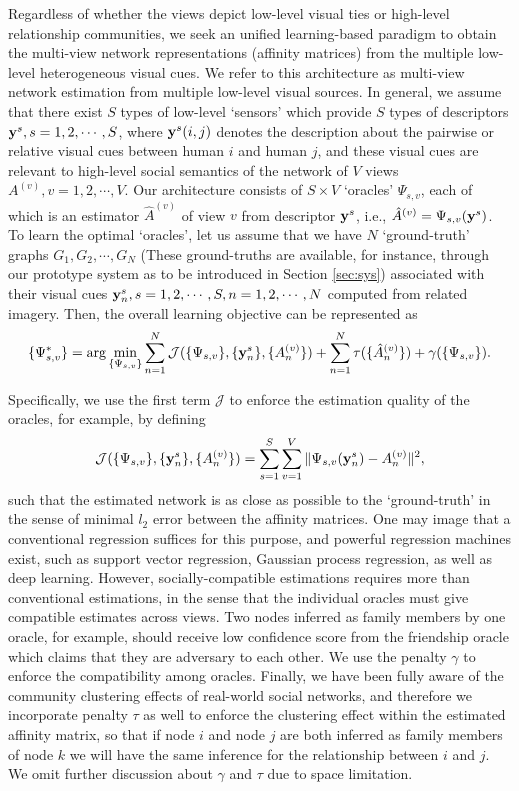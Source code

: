 Regardless of whether the views depict low-level visual ties or high-level relationship communities, we seek an unified learning-based paradigm to obtain the multi-view network representations (affinity matrices) from the multiple low-level heterogeneous visual cues. We refer to this architecture as multi-view network estimation from multiple low-level visual sources. In general, we assume that there exist $S$ types of low-level `sensors' which provide $S$ types of descriptors ${\bf y}^s, s=1,2,\cdots,S$, where ${\bf y}^s(i,j)$ denotes the description about the pairwise or relative visual cues between human $i$ and human $j$, and these visual cues are relevant to high-level social semantics of the network of $V$ views $A^{(v)}, v=1,2,\cdots,V$. Our architecture consists of $S\times V$ `oracles' $\Psi_{s,v}$, each of which is an estimator $\hat{A}^{(v)}$ of view $v$ from descriptor ${\bf y}^s$, i.e., $\hat{A}^{(v)}=\Psi_{s,v}({\bf y}^s)$. To learn the optimal `oracles', let us assume that we have $N$ `ground-truth' graphs $G_1, G_2, \cdots, G_N$ (These ground-truths are available, for instance, through our prototype system as to be introduced in Section \ref{sec:sys}) associated with their visual cues ${\bf y}^{s}_{n}, s=1,2,\cdots,S, n=1,2,\cdots,N$ computed from related imagery. Then, the overall learning objective can be represented as 
\begin{equation}\label{eq:sensing}
\{\Psi^{*}_{s,v}\}=\arg\min_{\{\Psi_{s,v}\}}\sum_{n=1}^{N}\mathcal{J}(\{\Psi_{s,v}\}, \{{\bf y}^{s}_n\}, \{A^{(v)}_n\})+\sum_{n=1}^{N}\tau(\{\hat{A}^{(v)}_n\})+\gamma(\{\Psi_{s,v}\}).
 \end{equation}
 
Specifically, we use the first term $\mathcal{J}$ to enforce the estimation quality of the oracles, for example, by defining
\begin{equation}\label{eq:L2error}
\mathcal{J}(\{\Psi_{s,v}\}, \{{\bf y}^{s}_n\}, \{A^{(v)}_n\})=\sum_{s=1}^{S}\sum_{v=1}^{V}\|\Psi_{s,v}({\bf y}^{s}_n)-A^{(v)}_n\|^{2},
 \end{equation}
such that the estimated network is as close as possible to the `ground-truth' in the sense of minimal $l_2$ error between the affinity matrices. One may image that a conventional regression suffices for this purpose, and powerful regression machines exist, such as support vector regression, Gaussian process regression, as well as deep learning. However, socially-compatible estimations requires more than conventional estimations, in the sense that the individual oracles must give compatible estimates across views. Two nodes inferred as family members by one oracle, for example, should receive low confidence score from the friendship oracle which claims that they are adversary to each other. We use the penalty $\gamma$ to enforce the compatibility among oracles. Finally, we have been fully aware of the community clustering effects of real-world social networks, and therefore we incorporate penalty $\tau$ as well to enforce the clustering effect within the estimated affinity matrix, so that if node $i$ and node $j$ are both inferred as family members of node $k$ we will have the same inference for the relationship between $i$ and $j$. We omit further discussion about $\gamma$ and $\tau$ due to space limitation.


